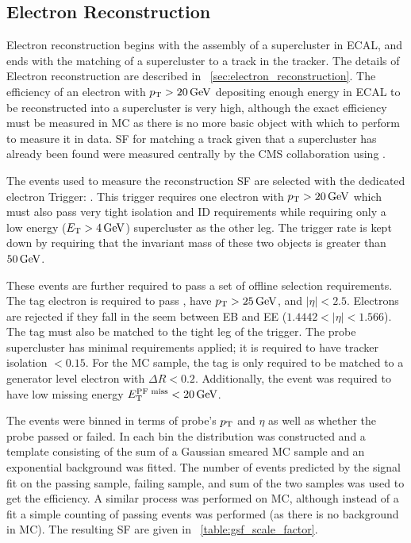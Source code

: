 \subsection{Electron Reconstruction}
\label{ssec:sf_reconstruction}

Electron reconstruction begins with the assembly of a supercluster in ECAL, and
ends with the matching of a supercluster to a track in the tracker. The details
of Electron reconstruction are described in
\SEC~\ref{sec:electron_reconstruction}. The efficiency of an electron with $p_{\mathrm{T}}
> 20 \,\text{Ge\hspace{-.08em}V}$ depositing enough energy in ECAL to be reconstructed into a
supercluster is very high, although the exact efficiency must be measured in
MC as there is no more basic object with which to perform \TnP to measure it in
data. SF for matching a track given that a supercluster has already been found
were measured centrally by the CMS collaboration using \TnP
\cite{gsf_scale_factors_2013}.

The events used to measure the reconstruction SF are selected with the
dedicated electron \TnP Trigger: \TnPTrigger. This trigger requires one
electron with $p_{\mathrm{T}} > 20 \,\text{Ge\hspace{-.08em}V}$ which must also pass very tight isolation and ID
requirements while requiring only a low energy ($E_{\mathrm{T}} > 4 \,\text{Ge\hspace{-.08em}V}$) supercluster as
the other leg. The trigger rate is kept down by requiring that the invariant
mass of these two objects is greater than $50 \,\text{Ge\hspace{-.08em}V}$.

These events are further required to pass a set of offline selection
requirements. The tag electron is required to pass \EGTIGHT, have $p_{\mathrm{T}} > 25
\,\text{Ge\hspace{-.08em}V}$, and $|\eta| < 2.5$. Electrons are rejected if they fall in the seem
between EB and EE ($1.4442 < |\eta| < 1.566$). The tag must also be matched to
the tight leg of the \TnP trigger. The probe supercluster has minimal
requirements applied; it is required to have tracker isolation $< 0.15$. For
the MC sample, the tag is only required to be matched to a generator level
electron with $\Delta R < 0.2$. Additionally, the event was required to have
low \particleflow missing energy $E_{\mathrm{T}}^{\text{PF miss}} < 20 \,\text{Ge\hspace{-.08em}V}$. 

The events were binned in terms of probe's $p_{\mathrm{T}}$ and $\eta$ as well as whether
the probe passed or failed. In each bin the \mee distribution was constructed
and a template consisting of the sum of a Gaussian smeared \Ztoee MC sample and
an exponential background was fitted. The number of events predicted by the
signal fit on the passing sample, failing sample, and sum of the two samples
was used to get the efficiency. A similar process was performed on MC, although
instead of a fit a simple counting of passing events was performed (as there is
no background in MC). The resulting SF are given in
\TAB~\ref{table:gsf_scale_factor}.

